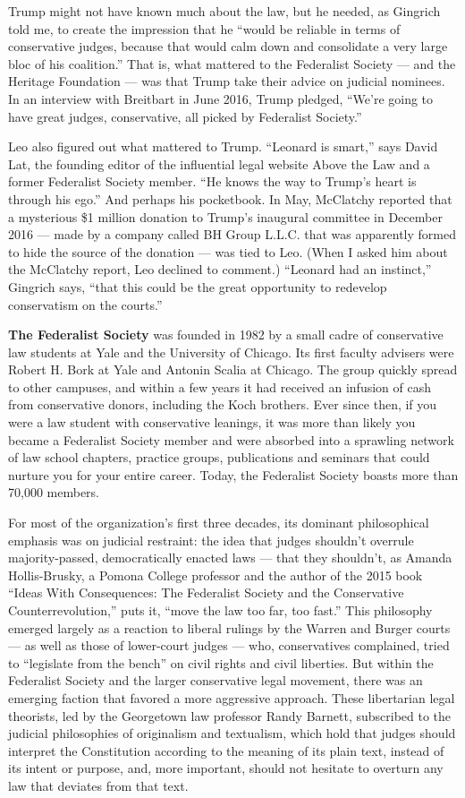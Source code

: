 Trump might not have known much about the law, but he needed, as
Gingrich told me, to create the impression that he ``would be reliable
in terms of conservative judges, because that would calm down and
consolidate a very large bloc of his coalition.'' That is, what mattered
to the Federalist Society --- and the Heritage Foundation --- was that
Trump take their advice on judicial nominees. In an interview with
Breitbart in June 2016, Trump pledged, ``We're going to have great
judges, conservative, all picked by Federalist Society.''

Leo also figured out what mattered to Trump. ``Leonard is smart,'' says
David Lat, the founding editor of the influential legal website Above
the Law and a former Federalist Society member. ``He knows the way to
Trump's heart is through his ego.'' And perhaps his pocketbook. In May,
McClatchy reported that a mysterious \$1 million donation to Trump's
inaugural committee in December 2016 --- made by a company called BH
Group L.L.C. that was apparently formed to hide the source of the
donation --- was tied to Leo. (When I asked him about the McClatchy
report, Leo declined to comment.) ``Leonard had an instinct,'' Gingrich
says, ``that this could be the great opportunity to redevelop
conservatism on the courts.''

\textbf{The Federalist Society} was founded in 1982 by a small cadre of
conservative law students at Yale and the University of Chicago. Its
first faculty advisers were Robert H. Bork at Yale and Antonin Scalia at
Chicago. The group quickly spread to other campuses, and within a few
years it had received an infusion of cash from conservative donors,
including the Koch brothers. Ever since then, if you were a law student
with conservative leanings, it was more than likely you became a
Federalist Society member and were absorbed into a sprawling network of
law school chapters, practice groups, publications and seminars that
could nurture you for your entire career. Today, the Federalist Society
boasts more than 70,000 members.

For most of the organization's first three decades, its dominant
philosophical emphasis was on judicial restraint: the idea that judges
shouldn't overrule majority-passed, democratically enacted laws --- that
they shouldn't, as Amanda Hollis-Brusky, a Pomona College professor and
the author of the 2015 book ``Ideas With Consequences: The Federalist
Society and the Conservative Counterrevolution,'' puts it, ``move the
law too far, too fast.'' This philosophy emerged largely as a reaction
to liberal rulings by the Warren and Burger courts --- as well as those
of lower-court judges --- who, conservatives complained, tried to
``legislate from the bench'' on civil rights and civil liberties. But
within the Federalist Society and the larger conservative legal
movement, there was an emerging faction that favored a more aggressive
approach. These libertarian legal theorists, led by the Georgetown law
professor Randy Barnett, subscribed to the judicial philosophies of
originalism and textualism, which hold that judges should interpret the
Constitution according to the meaning of its plain text, instead of its
intent or purpose, and, more important, should not hesitate to overturn
any law that deviates from that text.


